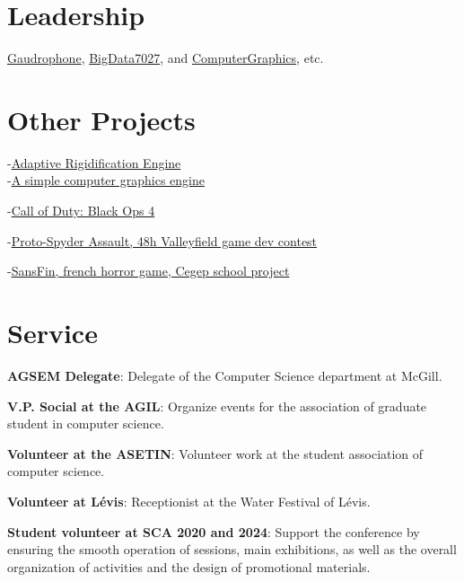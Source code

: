 \documentclass[10pt]{article} %
\begin{document}

\section{Leadership}
{
\href{https://github.com/AlexandreMercierAubin/Gaudrophone}{Gaudrophone}, \href{https://github.com/AlexandreMercierAubin/BigData7027}{BigData7027}, and \href{https://github.com/AlexandreMercierAubin/ComputerGraphics}{ComputerGraphics}, etc. 
}
{}

\section{Other Projects}

{
-\href{https://github.com/AlexandreMercierAubin/AdaptiveRigidification2022}{Adaptive Rigidification Engine}\\
-\href{https://github.com/AlexandreMercierAubin/ComputerGraphics}{A simple computer graphics engine}\\

}

{
-\href{https://www.callofduty.com/ca/en/blackops4}{Call of Duty: Black Ops 4}

-\href{https://youtu.be/qJjy8b0kuSY}{Proto-Spyder Assault, 48h Valleyfield game dev contest}

-\href{https://youtu.be/s6vr07Nt1IY}{SansFin, french horror game, Cegep school project}
}

\section{Service}
\textbf{AGSEM Delegate}: Delegate of the Computer Science department at McGill.

\noindent\textbf{V.P. Social at the AGIL}: Organize events for the association of graduate student in computer science.

\noindent\textbf{Volunteer at the ASETIN}: Volunteer work at the student association of computer science. 

\noindent\textbf{Volunteer at Lévis}: Receptionist at the Water Festival of Lévis.

\noindent\textbf{Student volunteer at SCA 2020 and 2024}: Support the conference by ensuring the smooth operation of sessions, main exhibitions, as well as the overall organization of activities and the design of promotional materials.
\end{document}
